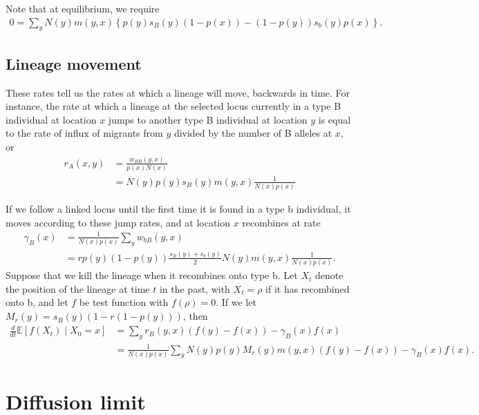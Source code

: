\documentclass{article}
\newcommand{\E}{\mathbb{E}}
\newcommand{\deriv}[1]{\frac{d}{d#1}}
\newcommand{\given}{\;\vert\;}
\begin{document}
Note that at equilibrium, we require
\begin{align}
  0 = \sum_y N(y) m(y,x) \left\{ p(y)s_B(y)(1-p(x)) - (1-p(y))s_b(y)p(x) \right\} .
\end{align}

\subsection{Lineage movement}

These rates tell us the rates at which a lineage will move, backwards in time.
For instance, the rate at which a lineage at the selected locus
currently in a type B individual at location $x$
jumps to another type B individual at location $y$ is equal to the rate of influx of migrants from $y$
divided by the number of B alleles at $x$,
or
\begin{align}
  r_A(x,y) &= \frac{w_{BB}(y,x)}{p(x)N(x)} \\
  &= N(y) p(y)  s_B(y) m(y,x) \frac{ 1 }{ N(x) p(x) }
\end{align}

If we follow a linked locus until the first time it is found in a type b individual,
it moves according to these jump rates, and at location $x$ recombines at rate
\begin{align}
  \gamma_B(x) &= \frac{1}{N(x)p(x)}\sum_y w_{bB}(y,x)  \\
  &= r p(y) (1-p(y)) \frac{s_B(y)+s_b(y)}{2} N(y) m(y,x) \frac{1}{N(x)p(x)}.
\end{align}
Suppose that we kill the lineage when it recombines onto type b.
Let $X_t$ denote the position of the lineage at time $t$ in the past,
with $X_t = \rho$ if it has recombined onto b,
and let $f$ be test function with $f(\rho)=0$.
If we let $M_r(y) = s_B(y) \left(1 - r (1-p(y)) \right)$, then
\begin{align}
    \deriv{t} \E[f(X_t) \given X_0=x ] &= \sum_y r_{B}(y,x) ( f(y)-f(x) ) - \gamma_B(x) f(x) \\
    &= \frac{1}{N(x)p(x)} \sum_y  N(y) p(y) M_r(y) m(y,x) ( f(y) - f(x)  ) - \gamma_B(x) f(x) . \label{eqn:discrete_generator}
\end{align}

\section{Diffusion limit}
\end{document}
